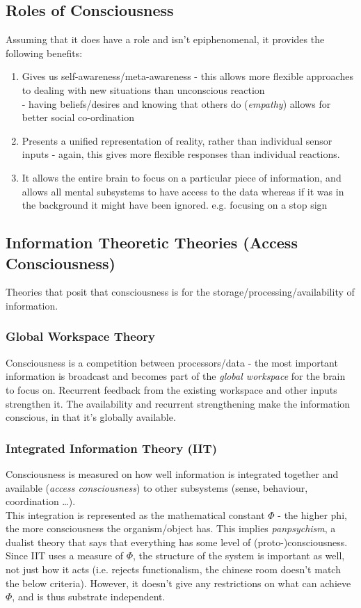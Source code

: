 \subsection{Roles of Consciousness}
Assuming that it does have a role and isn't epiphenomenal, it provides the following benefits:
\begin{enumerate}
    \item Gives us self-awareness/meta-awareness - this allows more flexible approaches to dealing with new situations than unconscious reaction\\ \quad - having beliefs/desires and knowing that others do (\emph{empathy}) allows for better social co-ordination
    \item Presents a unified representation of reality, rather than individual sensor inputs - again, this gives more flexible responses than individual reactions. 
    \item It allows the entire brain to focus on a particular piece of information, and allows all mental subsystems to have access to the data whereas if it was in the background it might have been ignored. e.g. focusing on a stop sign
\end{enumerate}

\subsection{Information Theoretic Theories (Access Consciousness)}
Theories that posit that consciousness is for the storage/processing/availability of information.

\subsubsection{Global Workspace Theory}
Consciousness is a competition between processors/data - the most important information is broadcast and becomes part of the \emph{global workspace} for the brain to focus on. Recurrent feedback from the existing workspace and other inputs strengthen it. The availability and recurrent strengthening make the information conscious, in that it's globally available.

\subsubsection{Integrated Information Theory (IIT)}
Consciousness is measured on how well information is integrated together and available (\emph{access consciousness}) to other subsystems (sense, behaviour, coordination \dots). \\
This integration is represented as the mathematical constant $\Phi$ - the higher phi, the more consciousness the organism/object has. This implies \emph{panpsychism}, a dualist theory that says that everything has some level of (proto-)consciousness.\\
Since IIT uses a measure of $\Phi$, the structure of the system is important as well, not just how it acts (i.e. rejects functionalism, the chinese room doesn't match the below criteria). However, it doesn't give any restrictions on what can achieve $\Phi$, and is thus substrate independent.

